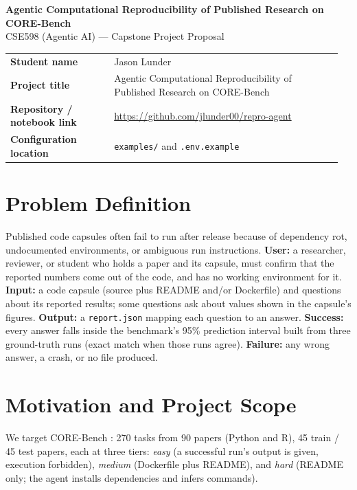 \documentclass[10pt]{article}
\begin{document}
{\Large \bfseries Agentic Computational Reproducibility of Published Research on CORE-Bench}\\[2pt]
{\large CSE598 (Agentic AI) --- Capstone Project Proposal}

\vspace{2pt}
\renewcommand{\arraystretch}{1.0}
\begin{tabular}{@{}p{0.30\linewidth}p{0.66\linewidth}@{}}
\toprule
\textbf{Student name} & Jason Lunder \\
\textbf{Project title} & Agentic Computational Reproducibility of Published Research on CORE-Bench \\
\textbf{Repository / notebook link} & \url{https://github.com/jlunder00/repro-agent} \\
\textbf{Configuration location} & \texttt{examples/} and \texttt{.env.example} \\
\bottomrule
\end{tabular}

\section{Problem Definition}
Published code capsules often fail to run after release because of dependency rot, undocumented environments, or ambiguous run instructions. \textbf{User:} a researcher, reviewer, or student who holds a paper and its capsule, must confirm that the reported numbers come out of the code, and has no working environment for it. \textbf{Input:} a code capsule (source plus README and/or Dockerfile) and questions about its reported results; some questions ask about values shown in the capsule's figures. \textbf{Output:} a \texttt{report.json} mapping each question to an answer. \textbf{Success:} every answer falls inside the benchmark's 95\% prediction interval built from three ground-truth runs (exact match when those runs agree). \textbf{Failure:} any wrong answer, a crash, or no file produced.

\section{Motivation and Project Scope}
We target CORE-Bench \citep{siegel2024corebench,corebenchgithub}: 270 tasks from 90 papers (Python and R), 45 train / 45 test papers, each at three tiers: \emph{easy} (a successful run's output is given, execution forbidden), \emph{medium} (Dockerfile plus README), and \emph{hard} (README only; the agent installs dependencies and infers commands).
\end{document}

